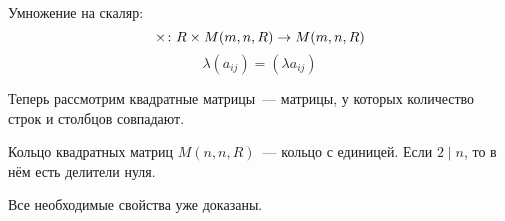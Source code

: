 \begin{Def}
Умножение на скаляр:
$$\times\colon R \times M(m, n, R) \rightarrow M(m, n, R)$$
$$\lambda (a_{ij}) = (\lambda a_{ij})$$
\end{Def}

Теперь рассмотрим квадратные матрицы~--- матрицы, у которых количество строк и столбцов совпадают.

\begin{theorem}{Кольцо квадратных матриц}
$M(n, n, R)$~--- кольцо с единицей. Если $2 \mid n$, то в нём есть делители нуля.
\end{theorem}
Все необходимые свойства уже доказаны.